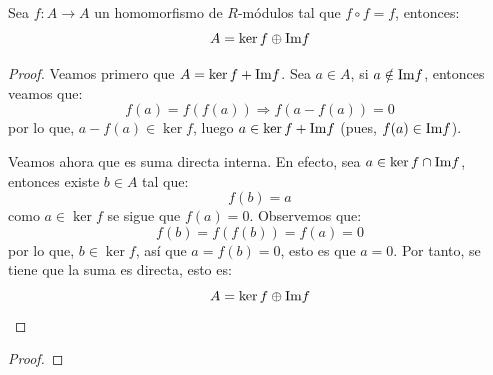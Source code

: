 \documentclass[12pt]{report}
\theoremstyle{largebreak}
\newcommand\cf[3]{\ensuremath{#1:#2\rightarrow#3}}
\newcommand{\im}{\ensuremath{\textup{Im}}}
\begin{document}
    \begin{excer}
        Sea $\cf{f}{A}{A}$ un homomorfismo de $R$-módulos tal que $f\circ f=f$, entonces:
        \begin{equation*}
            A=\ker f\oplus\im f
        \end{equation*}
    \end{excer}

    \begin{proof}
        Veamos primero que $A=\ker f+\im f$. Sea $a\in A$, si $a\notin\im f$, entonces veamos que:
        \begin{equation*}
            f(a)=f(f(a))\Rightarrow f(a-f(a))=0
        \end{equation*}
        por lo que, $a-f(a)\in\ker f$, luego $a\in\ker f+\im f$ (pues, $f(a)\in\im f$).

        Veamos ahora que es suma directa interna. En efecto, sea $a\in\ker f\cap\im f$, entonces existe $b\in A$ tal que:
        \begin{equation*}
            f(b)=a
        \end{equation*}
        como $a\in\ker f$ se sigue que $f(a)=0$. Observemos que:
        \begin{equation*}
            f(b)=f(f(b))=f(a)=0
        \end{equation*}
        por lo que, $b\in\ker f$, así que $a=f(b)=0$, esto es que $a=0$. Por tanto, se tiene que la suma es directa, esto es:
        \begin{equation*}
            A=\ker f\oplus\im f
        \end{equation*}
    \end{proof}

    \begin{excer}[Nombre]
        
    \end{excer}

    \begin{proof}
        
    \end{proof}
\end{document}
